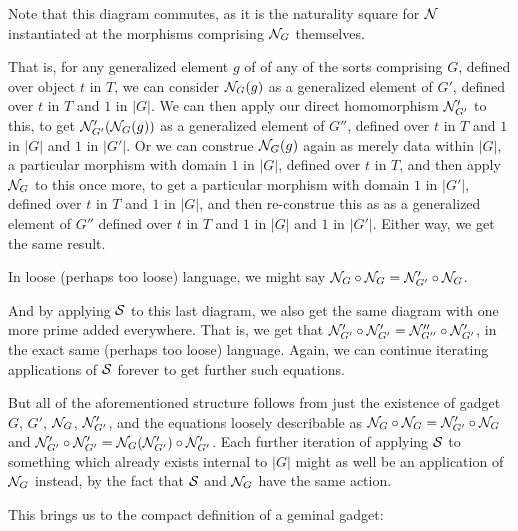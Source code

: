 \documentclass[./main.tex]{subfiles}
\begin{document}
\begin{observation}
Note that this diagram commutes, as it is the naturality square for $\mathcal{N}$ instantiated at the morphisms comprising $\mathcal{N}_G$ themselves.

That is, for any generalized element $g$ of of any of the sorts comprising $G$, defined over object $t$ in $T$, we can consider $\mathcal{N}_G(g)$ as a generalized element of $G'$, defined over $t$ in $T$ and $1$ in $|G|$. We can then apply our direct homomorphism $\mathcal{N}'_{G'}$ to this, to get $\mathcal{N}'_{G'}(\mathcal{N}_G(g))$ as a generalized element of $G''$, defined over $t$ in $T$ and $1$ in $|G|$ and $1$ in $|G'|$. Or we can construe $\mathcal{N}_G(g)$ again as merely data within $|G|$, a particular morphism with domain $1$ in $|G|$, defined over $t$ in $T$, and then apply $\mathcal{N}_G$ to this once more, to get a particular morphism with domain $1$ in $|G'|$, defined over $t$ in $T$ and $1$ in $|G|$, and then re-construe this as as a generalized element of $G''$ defined over $t$ in $T$ and $1$ in $|G|$ and $1$ in $|G'|$. Either way, we get the same result.

In loose (perhaps too loose) language, we might say $\mathcal{N}_G \circ \mathcal{N}_G = \mathcal{N}'_{G'} \circ \mathcal{N}_G$.

And by applying $\mathcal{S}$ to this last diagram, we also get the same diagram with one more prime added everywhere. That is, we get that $\mathcal{N}'_{G'} \circ \mathcal{N}'_{G'} = \mathcal{N}''_{G''} \circ \mathcal{N}'_{G'}$, in the exact same (perhaps too loose) language. Again, we can continue iterating applications of $\mathcal{S}$ forever to get further such equations.

But all of the aforementioned structure follows from just the existence of gadget $G$, $G'$, $\mathcal{N}_G$, $\mathcal{N}'_{G'}$, and the equations loosely describable as $\mathcal{N}_G \circ \mathcal{N}_G = \mathcal{N}'_{G'} \circ \mathcal{N}_G$ and $\mathcal{N}'_{G'} \circ \mathcal{N}'_{G'} = \mathcal{N}_G(\mathcal{N}'_{G'}) \circ \mathcal{N}'_{G'}$. Each further iteration of applying $\mathcal{S}$ to something which already exists internal to $|G|$ might as well be an application of $\mathcal{N}_{G}$ instead, by the fact that $\mathcal{S}$ and $\mathcal{N}_{G}$ have the same action.
\end{observation}

This brings us to the compact definition of a geminal gadget:
\end{document}

